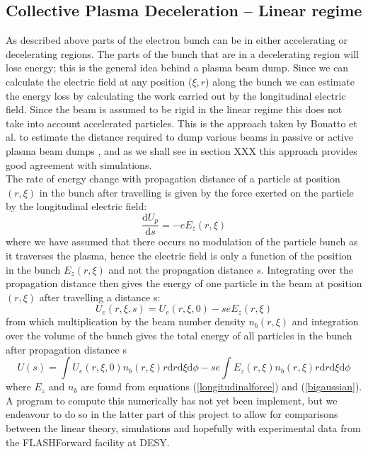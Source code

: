 \subsection{Collective Plasma Deceleration -- Linear regime }
As described above parts of the electron bunch can be in either accelerating or decelerating regions. The parts of the bunch that are in a decelerating region will lose energy; this is the general idea behind a plasma beam dump. Since we can calculate the electric field at any position ($\xi,r$) along the bunch we can estimate the energy loss by calculating the work carried out by the longitudinal electric field. Since the beam is assumed to be rigid in the linear regime this does not take into account accelerated particles. This is the approach taken by Bonatto et al. to estimate the distance required to dump various beams in passive or active plasma beam dumps \citep{Bonatto2016}, and as we shall see in section XXX this approach provides good agreement with simulations.\\
The rate of energy change with propagation distance of a particle at position $(r,\xi)$ in the bunch after travelling is given by the force exerted on the particle by the longitudinal electric field:
\begin{equation}
\frac{\mathrm{d}U_p}{\mathrm{d}s}=-eE_z(r,\xi)
\end{equation}
where we have assumed that there occurs no modulation of the particle bunch as it traverses the plasma, hence the electric field is only a function of the position in the bunch $E_z(r,\xi)$ and not the propagation distance $s$. Integrating over the propagation distance then gives the energy of one particle in the beam at position $(r,\xi)$ after travelling a distance s:
\begin{equation}
U_e(r,\xi,s)=U_e(r,\xi,0)-seE_z(r,\xi)
\end{equation}
from which multiplication by the beam number density $n_b(r,\xi)$ and integration over the volume of the bunch gives the total energy of all particles in the bunch after propagation distance s
\begin{equation}
U(s)=\int  U_e(r,\xi,0)n_b(r,\xi)r\mathrm{d}r\mathrm{d}\xi\mathrm{d}\phi-se\int E_z(r,\xi)n_b(r,\xi)r\mathrm{d}r\mathrm{d}\xi\mathrm{d}\phi
\label{energy_loss_bonatto}
\end{equation}
where $E_z$ and $n_b$ are found from equations (\ref{longitudinalforce}) and (\ref{bigaussian}). A program to compute this numerically has not yet been implement, but we endeavour to do so in the latter part of this project to allow for comparisons between the linear theory, simulations and hopefully with experimental data from the FLASHForward facility at DESY.
